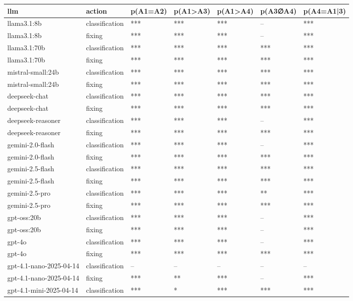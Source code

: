 \begin{table}[!t]
\centering\scriptsize
\begin{tabular}{lllllll}
\toprule
llm & action & p(A1=A2) & p(A1>A3) & p(A1>A4) & p(A3∅A4) & p(A4=A1|3) \\
\midrule
llama3.1:8b & classification & *** & *** & *** & -- & *** \\
llama3.1:8b & fixing & *** & *** & *** & -- & *** \\
llama3.1:70b & classification & *** & *** & *** & *** & *** \\
llama3.1:70b & fixing & *** & *** & *** & *** & *** \\
mistral-small:24b & classification & *** & *** & *** & *** & *** \\
mistral-small:24b & fixing & *** & *** & *** & *** & *** \\
deepseek-chat & classification & *** & *** & *** & *** & *** \\
deepseek-chat & fixing & *** & *** & *** & *** & *** \\
deepseek-reasoner & classification & *** & *** & *** & -- & *** \\
deepseek-reasoner & fixing & *** & *** & *** & *** & *** \\
gemini-2.0-flash & classification & *** & *** & *** & -- & *** \\
gemini-2.0-flash & fixing & *** & *** & *** & *** & *** \\
gemini-2.5-flash & classification & *** & *** & *** & *** & *** \\
gemini-2.5-flash & fixing & *** & *** & *** & *** & *** \\
gemini-2.5-pro & classification & *** & *** & *** & ** & *** \\
gemini-2.5-pro & fixing & *** & *** & *** & *** & *** \\
gpt-oss:20b & classification & *** & *** & *** & -- & *** \\
gpt-oss:20b & fixing & *** & *** & *** & -- & *** \\
gpt-4o & classification & *** & *** & *** & -- & *** \\
gpt-4o & fixing & *** & *** & *** & *** & *** \\
gpt-4.1-nano-2025-04-14 & classification & -- & -- & -- & -- & -- \\
gpt-4.1-nano-2025-04-14 & fixing & *** & ** & *** & -- & *** \\
gpt-4.1-mini-2025-04-14 & classification & *** & * & *** & *** & *** \\

\end{tabular}
\end{table}
